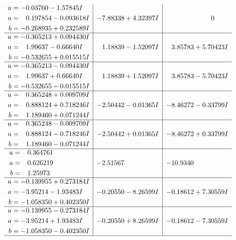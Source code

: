 \documentclass[1p]{elsarticle_modified}
\theoremstyle{definition}
\begin{document}
$$\begin{array}{c|c|c}
\begin{aligned}
u &= -0.03760 - 1.57845 I \\
a &= \phantom{-}0.197854 - 0.093618 I \\
b &= -0.268935 + 0.232589 I\end{aligned}
 & -7.88338 + 4.32397 I & \phantom{-0.000000 } 0 \\ \hline\begin{aligned}
u &= -0.365213 + 0.094430 I \\
a &= \phantom{-}1.99637 - 0.66640 I \\
b &= -0.532655 + 0.015515 I\end{aligned}
 & \phantom{-}1.18839 - 1.52097 I & \phantom{-}3.85783 + 5.70423 I \\ \hline\begin{aligned}
u &= -0.365213 - 0.094430 I \\
a &= \phantom{-}1.99637 + 0.66640 I \\
b &= -0.532655 - 0.015515 I\end{aligned}
 & \phantom{-}1.18839 + 1.52097 I & \phantom{-}3.85783 - 5.70423 I \\ \hline\begin{aligned}
u &= \phantom{-}0.365248 + 0.009709 I \\
a &= \phantom{-}0.888124 + 0.718246 I \\
b &= \phantom{-}1.189460 + 0.071244 I\end{aligned}
 & -2.50442 - 0.01365 I & -8.46272 - 0.33799 I \\ \hline\begin{aligned}
u &= \phantom{-}0.365248 - 0.009709 I \\
a &= \phantom{-}0.888124 - 0.718246 I \\
b &= \phantom{-}1.189460 - 0.071244 I\end{aligned}
 & -2.50442 + 0.01365 I & -8.46272 + 0.33799 I \\ \hline\begin{aligned}
u &= \phantom{-}0.364761\phantom{ +0.000000I} \\
a &= \phantom{-}0.626219\phantom{ +0.000000I} \\
b &= \phantom{-}1.25973\phantom{ +0.000000I}\end{aligned}
 & -2.51567\phantom{ +0.000000I} & -10.9340\phantom{ +0.000000I} \\ \hline\begin{aligned}
u &= -0.139955 + 0.273184 I \\
a &= -3.95214 - 1.93483 I \\
b &= -1.058350 + 0.402350 I\end{aligned}
 & -0.20550 - 8.26599 I & -0.18612 + 7.30559 I \\ \hline\begin{aligned}
u &= -0.139955 - 0.273184 I \\
a &= -3.95214 + 1.93483 I \\
b &= -1.058350 - 0.402350 I\end{aligned}
 & -0.20550 + 8.26599 I & -0.18612 - 7.30559 I\\
 \hline 
 \end{array}$$\newpage\newpage\renewcommand{\arraystretch}{1}
\end{document}
